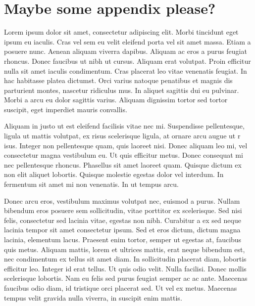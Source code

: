\chapter{Maybe some appendix please?}
Lorem ipsum dolor sit amet, consectetur adipiscing elit. Morbi tincidunt eget 
ipsum eu iaculis. Cras vel sem eu velit eleifend porta vel sit amet massa. Etiam 
a posuere nunc. Aenean aliquam viverra dapibus. Aliquam ac eros a purus feugiat 
rhoncus. Donec faucibus ut nibh ut cursus. Aliquam erat volutpat. Proin efficitur 
nulla sit amet iaculis condimentum. Cras placerat leo vitae venenatis feugiat. In 
hac habitasse platea dictumst. Orci varius natoque penatibus et magnis dis 
parturient montes, nascetur ridiculus mus. In aliquet sagittis dui eu pulvinar. 
Morbi a arcu eu dolor sagittis varius. Aliquam dignissim tortor sed tortor 
suscipit, eget imperdiet mauris convallis.

Aliquam in justo ut est eleifend facilisis vitae nec mi. Suspendisse pellentesque, 
ligula ut mattis volutpat, ex risus scelerisque ligula, at ornare arcu augue ut r
isus. Integer non pellentesque quam, quis laoreet nisi. Donec aliquam leo mi, vel 
consectetur magna vestibulum eu. Ut quis efficitur metus. Donec consequat mi nec 
pellentesque rhoncus. Phasellus sit amet laoreet quam. Quisque dictum ex non elit 
aliquet lobortis. Quisque molestie egestas dolor vel interdum. In fermentum sit 
amet mi non venenatis. In ut tempus arcu.

Donec arcu eros, vestibulum maximus volutpat nec, euismod a purus. Nullam bibendum 
eros posuere sem sollicitudin, vitae porttitor ex scelerisque. Sed nisi felis, 
consectetur sed lacinia vitae, egestas non nibh. Curabitur a ex sed neque lacinia 
tempor sit amet consectetur ipsum. Sed et eros dictum, dictum magna lacinia, 
elementum lacus. Praesent enim tortor, semper ut egestas at, faucibus quis metus. 
Aliquam mattis, lorem et ultrices mattis, erat neque bibendum est, nec condimentum 
ex tellus sit amet diam. In sollicitudin placerat diam, lobortis efficitur leo. 
Integer id erat tellus. Ut quis odio velit. Nulla facilisi. Donec mollis 
scelerisque lobortis. Nam eu felis sed purus feugiat semper ac ac ante. Maecenas 
faucibus odio diam, id tristique orci placerat sed. Ut vel ex metus. Maecenas 
tempus velit gravida nulla viverra, in suscipit enim mattis.
